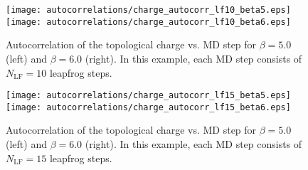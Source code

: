 %
\begin{figure}[htpb]\label{fig:charge_autocorrelation_lf10}
  \texttt{[image: autocorrelations/charge\_autocorr\_lf10\_beta5.eps]}
  \hfill
  \texttt{[image: autocorrelations/charge\_autocorr\_lf10\_beta6.eps]}
  \caption{Autocorrelation of the topological charge vs. MD step for $\beta = 5.0$ (left) and $\beta = 6.0$ (right). In
    this example, each MD step consists of $N_{\mathrm{LF}} = 10$ leapfrog steps.}
\end{figure}
%
\begin{figure}[htpb]\label{fig:charge_autocorrelation_lf15}
  \texttt{[image: autocorrelations/charge\_autocorr\_lf15\_beta5.eps]}
  \hfill
  \texttt{[image: autocorrelations/charge\_autocorr\_lf15\_beta6.eps]}
  \caption{Autocorrelation of the topological charge vs. MD step for $\beta = 5.0$ (left) and $\beta = 6.0$ (right). In
    this example, each MD step consists of $N_{\mathrm{LF}} = 15$ leapfrog steps.}
\end{figure}

\clearpage
